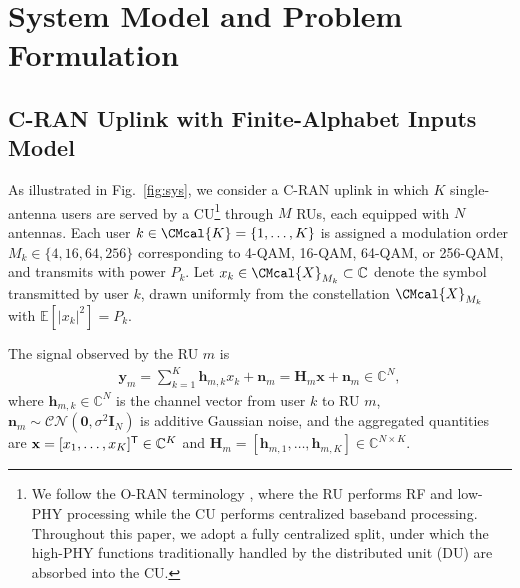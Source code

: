 \documentclass[10pt, twocolumn, comsoc]{IEEEtran}
\begin{document}
\section{System Model and Problem Formulation}
\label{sec:system_model}

\subsection{C-RAN Uplink with Finite-Alphabet Inputs Model}\label{subsec:cran_fa}

As illustrated in Fig.~\ref{fig:sys}, we consider a C-RAN uplink in which $K$ single-antenna 
users are served by a CU\footnote{We follow the O-RAN terminology \cite{oran2020wp}, where the RU performs RF and low-PHY processing while the CU performs centralized baseband processing. Throughout this paper, we adopt a fully centralized split, under which the high-PHY functions traditionally handled by the distributed unit (DU) are absorbed into the CU.} through $M$ RUs, 
each equipped with $N$ antennas. Each user $k \in 
\CMcal{K} = \{1, \dots, K\}$ is assigned a modulation 
order $M_k \in \{4, 16, 64, 256\}$ corresponding 
to 4-QAM, 16-QAM, 64-QAM, or 256-QAM, and transmits 
with power $P_k$. Let $x_k \in \CMcal{X}_{M_k} 
\subset \mathbb{C}$ denote the symbol transmitted by user $k$, drawn uniformly from the constellation 
$\CMcal{X}_{M_k}$ with 
$\mathbb{E}[|x_k|^2] = P_k$.

The signal observed by the RU $m$ is
\begin{align} \label{eq:received_signal}
  \mathbf{y}_m 
  = \sum_{k=1}^{K} \mathbf{h}_{m,k} x_k 
    + \mathbf{n}_m 
  = \mathbf{H}_m \mathbf{x} + \mathbf{n}_m 
  \in \mathbb{C}^{N},
\end{align}
where $\mathbf{h}_{m,k} \in \mathbb{C}^N$ is the 
channel vector from user $k$ to RU $m$, 
$\mathbf{n}_m \sim \mathcal{CN}(\mathbf{0}, \sigma^2 \mathbf{I}_N)$ is additive Gaussian noise, and the 
aggregated quantities are 
$\mathbf{x} = [x_1, \dots, x_K]^{\sf T} \in 
\mathbb{C}^K$ and $\mathbf{H}_m = [\mathbf{h}_{m,1}, 
\dots, \mathbf{h}_{m,K}] \in \mathbb{C}^{N \times K}$.
\end{document}
